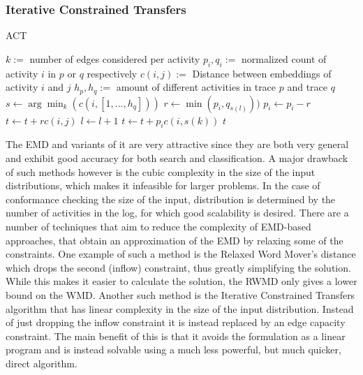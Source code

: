 \documentclass[runningheads]{template/llncs}
\begin{document}
\subsubsection{Iterative Constrained Transfers}
\begin{algorithm}
	\caption{ACT}\label{alg:act}
	\begin{algorithmic}
		\State $k:=$ number of edges considered per activity
		\State $p_i,q_i := $ normalized count of activity $i$ in $p$ or $q$ respectively
		\State $c(i,j) :=$ Distance between embeddings of activity $i$ and $j$
		\State $h_p,h_q :=$ amount of different activities in trace $p$ and trace $q$ 
		\State $s \gets \arg \min_k(c(i,[1,...,h_q]))$ 
		\State $r \gets \min(p_i,q_{s(l)}))$ 
		\State $p_i \gets p_i - r$ 
		\State $t \gets t + rc(i,j)$ 
		\State $l \gets l+1$
		\EndWhile
		 
		\State $t \gets t + p_ic(i,s(k))$ 
		\EndIf
		\EndFor
		\State \Return $t$
		\EndFunction
	\end{algorithmic}
\end{algorithm}
The EMD and variants of it are very attractive since they are both very general and exhibit good accuracy for both search and classification.
A major drawback of such methods however is the cubic complexity in the size of the input distributions, which makes it infeasible for larger problems.
In the case of conformance checking the size of the input, distribution is determined by the number of activities in the log, for which good scalability is desired.
There are a number of techniques that aim to reduce the complexity of EMD-based approaches, that obtain an approximation of the EMD by relaxing some of the constraints.  
One example of such a method is the Relaxed Word Mover's distance which drops the second (inflow) constraint, thus greatly simplifying the solution.
While this makes it easier to calculate the solution, the RWMD only gives a lower bound on the WMD.
Another such method is the Iterative Constrained Transfers \cite{AtMi18} algorithm that has linear complexity in the size of the input distribution.
Instead of just dropping the inflow constraint it is instead replaced by an edge capacity constraint.
The main benefit of this is that it avoids the formulation as a linear program and is instead solvable using a much less powerful, but much quicker, direct algorithm.
\end{document}
